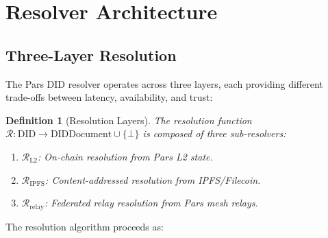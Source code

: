 \documentclass[11pt,a4paper]{article}
\newtheorem{definition}[theorem]{Definition}
\begin{document}
\section{Resolver Architecture}
\label{sec:resolver}

\subsection{Three-Layer Resolution}

The Pars DID resolver operates across three layers, each providing different
trade-offs between latency, availability, and trust:

\begin{definition}[Resolution Layers]
The resolution function $\mathcal{R}: \text{DID} \to \text{DIDDocument} \cup \{\bot\}$
is composed of three sub-resolvers:
\begin{enumerate}
    \item $\mathcal{R}_{\text{L2}}$: On-chain resolution from Pars L2 state.
    \item $\mathcal{R}_{\text{IPFS}}$: Content-addressed resolution from IPFS/Filecoin.
    \item $\mathcal{R}_{\text{relay}}$: Federated relay resolution from Pars mesh relays.
\end{enumerate}
\end{definition}

The resolution algorithm proceeds as:
\end{document}
